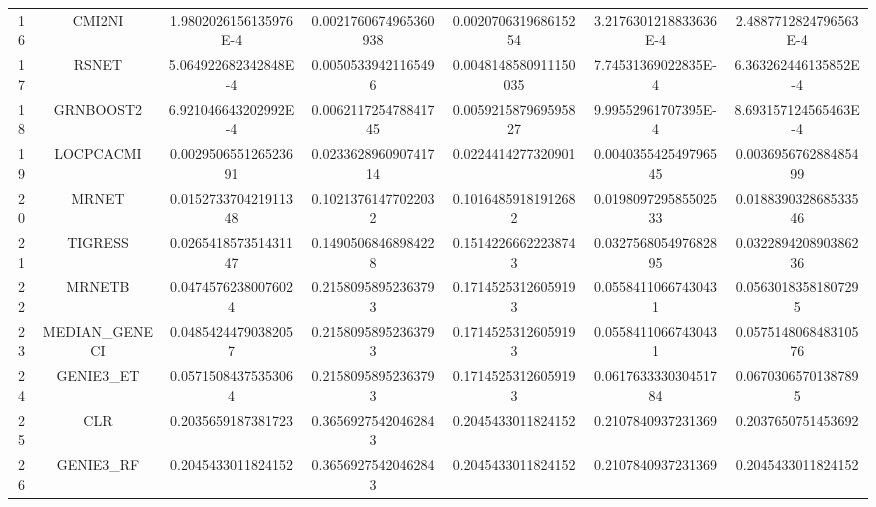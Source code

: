 \documentclass[a4paper,10pt]{article}
\begin{document}
\begin{landscape}
\begin{table}[!htp]
\begin{tabular}{ccccccc}
16&CMI2NI&1.9802026156135976E-4&0.0021760674965360938&0.002070631968615254&3.2176301218833636E-4&2.4887712824796563E-4\\
17&RSNET&5.064922682342848E-4&0.00505339421165496&0.0048148580911150035&7.74531369022835E-4&6.363262446135852E-4\\
18&GRNBOOST2&6.921046643202992E-4&0.006211725478841745&0.005921587969595827&9.99552961707395E-4&8.693157124565463E-4\\
19&LOCPCACMI&0.002950655126523691&0.023362896090741714&0.0224414277320901&0.004035542549796545&0.003695676288485499\\
20&MRNET&0.015273370421911348&0.10213761477022032&0.10164859181912682&0.019809729585502533&0.018839032868533546\\
21&TIGRESS&0.026541857351431147&0.14905068468984228&0.15142266622238743&0.032756805497682895&0.032289420890386236\\
22&MRNETB&0.04745762380076024&0.21580958952363793&0.17145253126059193&0.05584110667430431&0.05630183581807295\\
23&MEDIAN_GENECI&0.04854244790382057&0.21580958952363793&0.17145253126059193&0.05584110667430431&0.057514806848310576\\
24&GENIE3_ET&0.05715084375353064&0.21580958952363793&0.17145253126059193&0.061763333030451784&0.06703065701387895\\
25&CLR&0.2035659187381723&0.36569275420462843&0.2045433011824152&0.2107840937231369&0.2037650751453692\\
26&GENIE3_RF&0.2045433011824152&0.36569275420462843&0.2045433011824152&0.2107840937231369&0.2045433011824152\\
\hline
\end{tabular}
\end{table}


\newpage


\end{landscape}
\end{document}
